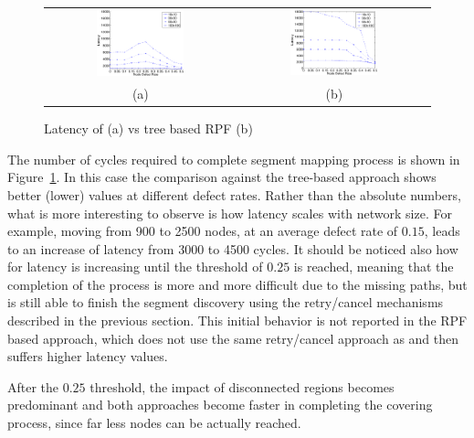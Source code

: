\begin{figure}
\centering
\begin{tabular}{cc}
\includegraphics[width=0.48\textwidth]{pictures/set2.eps} & 
\includegraphics[width=0.48\textwidth]{pictures/set2_rpf.eps} \\
(a) & (b)
\end{tabular}
\caption{Latency of \disr{} (a) vs tree based RPF (b) }
\label{fig:results_latency}
\end{figure}

The number of cycles required to complete segment mapping process is
shown in Figure~\ref{fig:results_latency}. In this case the comparison
against the tree-based approach shows better (lower) values at
different defect rates. Rather than the absolute numbers, what is more
interesting to observe is how \disr{} latency scales with network
size. For example, moving from 900 to 2500 nodes, at an average defect
rate of $0.15$, leads to an increase of latency from 3000 to 4500 cycles. It
should be noticed also how for \disr{} latency is increasing until the
threshold of $0.25$ is reached, meaning that the completion of the
process is more and more difficult due to the missing paths, but
\disr{} is still able to finish the segment discovery using the retry/cancel mechanisms
described in the previous section. This initial behavior is not reported in
the RPF based approach, which does not use
the same retry/cancel approach as \disr{} and then suffers higher latency values.

After the $0.25$ threshold, the impact of disconnected regions
becomes predominant and both approaches become faster in completing
the covering process, since far less nodes can be actually reached. 

